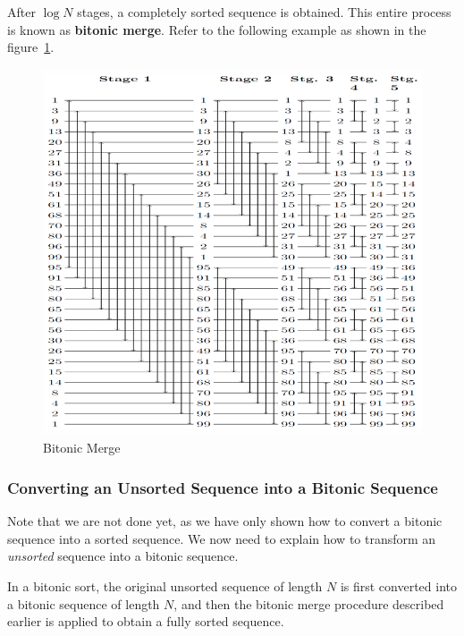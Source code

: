 \documentclass[12pt]{book}
\begin{document}
After $\log N$ stages, a completely sorted sequence is obtained. This entire process is known as \textbf{bitonic merge}. Refer to the following example as shown in the figure~\ref{fig:bitonicmerge}.
\begin{figure}[ht]
    \centering
    \includegraphics[width=\linewidth]{images/BitonicMerge.png}
    \caption{Bitonic Merge}
    \label{fig:bitonicmerge}
\end{figure}
\subsubsection{Converting an Unsorted Sequence into a Bitonic Sequence}

Note that we are not done yet, as we have only shown how to convert a bitonic sequence into a sorted sequence. We now need to explain how to transform an \emph{unsorted} sequence into a bitonic sequence.

In a bitonic sort, the original unsorted sequence of length $N$ is first converted into a bitonic sequence of length $N$, and then the bitonic merge procedure described earlier is applied to obtain a fully sorted sequence.
\end{document}
